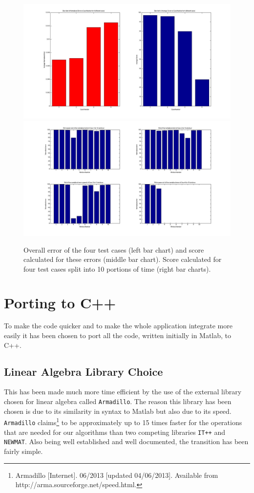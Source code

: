 \documentclass[11pt,a4paper]{article}
\begin{document}
\begin{figure}[H]
\centering
\includegraphics[scale=0.15]{Data_Analysis_Average_Score.jpg}
\includegraphics[scale=0.15]{Data_Analysis_Window_Score.jpg}

\caption{Overall error of the four test cases (left bar chart) and score calculated for these errors (middle bar chart). Score calculated for four test cases split into 10 portions of time (right bar charts).}
\label{error_score}
\end{figure}

\clearpage
\section{Porting to C++}
\noindent
To make the code quicker and to make the whole application integrate more easily it has been chosen to port all the code, written initially in Matlab, to C++. 
\subsection{Linear Algebra Library Choice}
This has been made much more time efficient by the use of the external library chosen for linear algebra called \texttt{Armadillo}. The reason this library has been chosen is due to its similarity in syntax to Matlab but also due to its speed. \texttt{Armadillo} claims\footnote{Armadillo [Internet]. 06/2013 [updated 04/06/2013]. Available from http://arma.sourceforge.net/speed.html.} to be approximately up to 15 times faster for the operations that are needed for our algorithms than two competing libraries \texttt{IT++} and \texttt{NEWMAT}. Also being well established and well documented, the transition has been fairly simple.  
\end{document}
